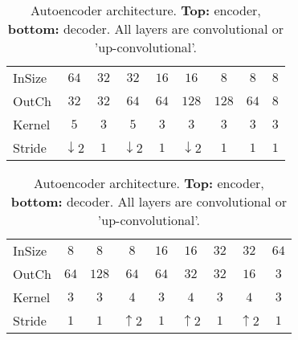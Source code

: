 \documentclass{article}
\begin{document}
\begin{table}
\begin{center}
   \setlength{\tabcolsep}{0.18cm}
  \small{
  \begin{tabular}{|l|cccccccc|}
      \hline
      \small{InSize} & $64$               & $32$ & $32$               & $16$  & $16$               & $8$   & $8$   & $8$  \\
      \small{OutCh}  & $32$               & $32$ & $64$               & $64$  & $128$              & $128$ & $64$  & $8$  \\
      \small{Kernel} & $5$                & $3$  & $5$                & $3$   & $3$                & $3$   & $3$   & $3$  \\
      \small{Stride} & $\downarrow \!2$   & $1$  & $\downarrow \!2$   & $1$   & $\downarrow \!2$   & $1$   & $1$   & $1$  \\
      \hline
    \end{tabular}}
\begin{center}
\end{center}
    \vspace{0.03cm}
    \small{
  \begin{tabular}{|l|cccccccc|}
      \hline
      \small{InSize} & $8$  & $8$   & $8$            & $16$  & $16$           & $32$  & $32$             & $64$ \\
      \small{OutCh}  & $64$ & $128$ & $64$           & $64$  & $32$           & $32$  & $16$             & $3$  \\
      \small{Kernel} & $3$  & $3$   & $4$            & $3$   & $4$            & $3$   & $4$              & $3$  \\
      \small{Stride} & $1$  & $1$   & $\uparrow \!2$ & $1$   & $\uparrow \!2$ & $1$   & $\uparrow \!2$   & $1$  \\
      \hline
    \end{tabular}}
\end{center}
  \caption{Autoencoder architecture. \textbf{Top:} encoder, \textbf{bottom:} decoder. All layers are convolutional or 'up-convolutional'.}
  \label{tbl:ae_arch}
\end{table}
\end{document}
